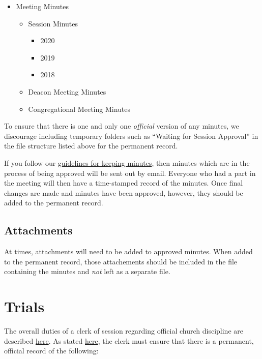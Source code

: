 \documentclass[
]{book}
\providecommand{\tightlist}{%
  \setlength{\itemsep}{0pt}\setlength{\parskip}{0pt}}
\begin{document}
\begin{itemize}
\tightlist
\item
  Meeting Minutes

  \begin{itemize}
  \tightlist
  \item
    Session Minutes

    \begin{itemize}
    \tightlist
    \item
      2020
    \item
      2019
    \item
      2018
    \end{itemize}
  \item
    Deacon Meeting Minutes
  \item
    Congregational Meeting Minutes
  \end{itemize}
\end{itemize}

To ensure that there is one and only one \emph{official} version of any minutes, we discourage including temporary folders such as ``Waiting for Session Approval'' in the file structure listed above for the permanent record.

If you follow our \href{keeping-minutes.html}{guidelines for keeping minutes}, then minutes which are in the process of being approved will be sent out by email. Everyone who had a part in the meeting will then have a time-stamped record of the minutes. Once final changes are made and minutes have been approved, however, they should be added to the permanent record.

\hypertarget{attachments}{%
\subsection{Attachments}\label{attachments}}

At times, attachments will need to be added to approved minutes. When added to the permanent record, those attachements should be included in the file containing the minutes and \emph{not} left as a separate file.

\hypertarget{trials}{%
\section{Trials}\label{trials}}

The overall duties of a clerk of session regarding official church discipline are described \href{church-discipline.html}{here}. As stated \href{church-discipline.html\#duties-of-the-clerk}{here}, the clerk must ensure that there is a permanent, official record of the following:
\end{document}
